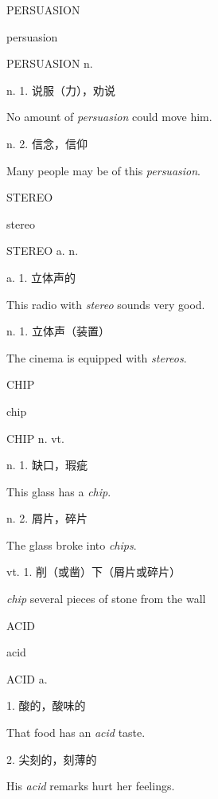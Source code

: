 \begin{flashcard}{
PERSUASION

persuasion
}
\begin{center}
PERSUASION n. 
\end{center}
n. 1. 说服（力），劝说

No amount of \textit{persuasion} could move him.

n. 2. 信念，信仰

Many people may be of this \textit{persuasion}.

\end{flashcard}
\begin{flashcard}{
STEREO

stereo
}
\begin{center}
STEREO a. n. 
\end{center}
a. 1. 立体声的

This radio with \textit{stereo} sounds very good.

n. 1. 立体声（装置）

The cinema is equipped with \textit{stereos}.

\end{flashcard}
\begin{flashcard}{
CHIP

chip
}
\begin{center}
CHIP n. vt. \textipa{[t\textesh ip]}
\end{center}
n. 1. 缺口，瑕疵

This glass has a \textit{chip}.

n. 2. 屑片，碎片

The glass broke into \textit{chips}.

vt. 1. 削（或凿）下（屑片或碎片）

\textit{chip} several pieces of stone from the wall

\end{flashcard}
\begin{flashcard}{
ACID

acid
}
\begin{center}
ACID a. 
\end{center}
1. 酸的，酸味的

That food has an \textit{acid} taste.

2. 尖刻的，刻薄的

His \textit{acid} remarks hurt her feelings.

\end{flashcard}
